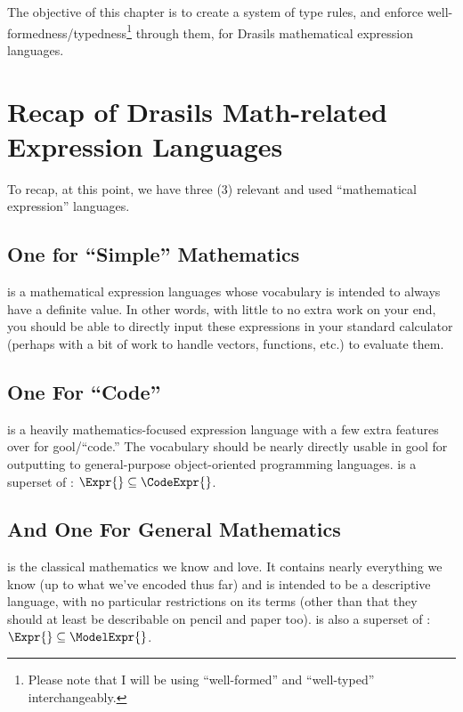 
The objective of this chapter is to create a system of type rules, and enforce
well-formedness/typedness\footnote{Please note that I will be using
``well-formed'' and ``well-typed'' interchangeably.} through them, for Drasils
mathematical expression languages.

\section{Recap of Drasils Math-related Expression Languages}

To recap, at this point, we have three (3) relevant and used ``mathematical
expression'' languages.

\subsection{One for \textquotedblleft{}Simple\textquotedblright{} Mathematics}

\Expr{} is a mathematical expression languages whose vocabulary is intended to
always have a definite value. In other words, with little to no extra work on
your end, you should be able to directly input these expressions in your
standard calculator (perhaps with a bit of work to handle vectors, functions,
etc.) to evaluate them.

\subsection{One For \textquotedblleft{}Code\textquotedblright{}}

\CodeExpr{} is a heavily mathematics-focused expression language with a few
extra features over \Expr{} for \acs{gool}/``code.'' The vocabulary should be
nearly directly usable in \acs{gool} for outputting to general-purpose
object-oriented programming languages. \CodeExpr{} is a superset of \Expr{}:
\(\Expr{} \subseteq{} \CodeExpr{}\).

\subsection{And One For General Mathematics}

\ModelExpr{} is the classical mathematics we know and love. It contains nearly
everything we know (up to what we've encoded thus far) and is intended to be a
descriptive language, with no particular restrictions on its terms (other than
that they should at least be describable on pencil and paper too). \ModelExpr{}
is also a superset of \Expr{}: \(\Expr{} \subseteq{} \ModelExpr{}\).

